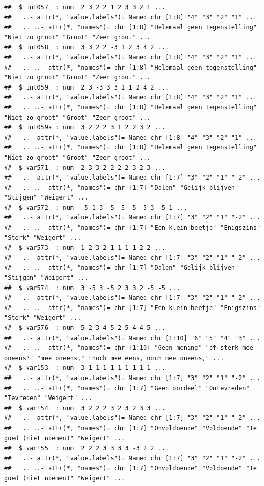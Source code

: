 \documentclass[
]{book}
\begin{document}
\begin{verbatim}
##  $ int057  : num  2 3 2 2 1 2 3 3 2 1 ...
##   ..- attr(*, "value.labels")= Named chr [1:8] "4" "3" "2" "1" ...
##   .. ..- attr(*, "names")= chr [1:8] "Helemaal geen tegenstelling" "Niet zo groot" "Groot" "Zeer groot" ...
##  $ int058  : num  3 3 2 2 -3 1 2 3 4 2 ...
##   ..- attr(*, "value.labels")= Named chr [1:8] "4" "3" "2" "1" ...
##   .. ..- attr(*, "names")= chr [1:8] "Helemaal geen tegenstelling" "Niet zo groot" "Groot" "Zeer groot" ...
##  $ int059  : num  2 3 -3 3 3 1 1 2 4 2 ...
##   ..- attr(*, "value.labels")= Named chr [1:8] "4" "3" "2" "1" ...
##   .. ..- attr(*, "names")= chr [1:8] "Helemaal geen tegenstelling" "Niet zo groot" "Groot" "Zeer groot" ...
##  $ int059a : num  3 2 2 2 3 1 2 2 3 2 ...
##   ..- attr(*, "value.labels")= Named chr [1:8] "4" "3" "2" "1" ...
##   .. ..- attr(*, "names")= chr [1:8] "Helemaal geen tegenstelling" "Niet zo groot" "Groot" "Zeer groot" ...
##  $ var571  : num  2 3 3 2 2 2 2 3 2 3 ...
##   ..- attr(*, "value.labels")= Named chr [1:7] "3" "2" "1" "-2" ...
##   .. ..- attr(*, "names")= chr [1:7] "Dalen" "Gelijk blijven" "Stijgen" "Weigert" ...
##  $ var572  : num  -5 1 3 -5 -5 -5 -5 3 -5 1 ...
##   ..- attr(*, "value.labels")= Named chr [1:7] "3" "2" "1" "-2" ...
##   .. ..- attr(*, "names")= chr [1:7] "Een klein beetje" "Enigszins" "Sterk" "Weigert" ...
##  $ var573  : num  1 2 3 2 1 1 1 1 2 2 ...
##   ..- attr(*, "value.labels")= Named chr [1:7] "3" "2" "1" "-2" ...
##   .. ..- attr(*, "names")= chr [1:7] "Dalen" "Gelijk blijven" "Stijgen" "Weigert" ...
##  $ var574  : num  3 -5 3 -5 2 3 3 2 -5 -5 ...
##   ..- attr(*, "value.labels")= Named chr [1:7] "3" "2" "1" "-2" ...
##   .. ..- attr(*, "names")= chr [1:7] "Een klein beetje" "Enigszins" "Sterk" "Weigert" ...
##  $ var576  : num  5 2 3 4 5 2 5 4 4 5 ...
##   ..- attr(*, "value.labels")= Named chr [1:10] "6" "5" "4" "3" ...
##   .. ..- attr(*, "names")= chr [1:10] "Geen mening" "of sterk mee oneens?" "mee oneens," "noch mee eens, noch mee oneens," ...
##  $ var153  : num  3 1 1 1 1 1 1 1 1 1 ...
##   ..- attr(*, "value.labels")= Named chr [1:7] "3" "2" "1" "-2" ...
##   .. ..- attr(*, "names")= chr [1:7] "Geen oordeel" "Ontevreden" "Tevreden" "Weigert" ...
##  $ var154  : num  3 2 2 2 3 2 3 2 3 3 ...
##   ..- attr(*, "value.labels")= Named chr [1:7] "3" "2" "1" "-2" ...
##   .. ..- attr(*, "names")= chr [1:7] "Onvoldoende" "Voldoende" "Te goed (niet noemen)" "Weigert" ...
##  $ var155  : num  2 2 2 3 3 3 3 -3 2 2 ...
##   ..- attr(*, "value.labels")= Named chr [1:7] "3" "2" "1" "-2" ...
##   .. ..- attr(*, "names")= chr [1:7] "Onvoldoende" "Voldoende" "Te goed (niet noemen)" "Weigert" ...

\end{verbatim}
\end{document}
